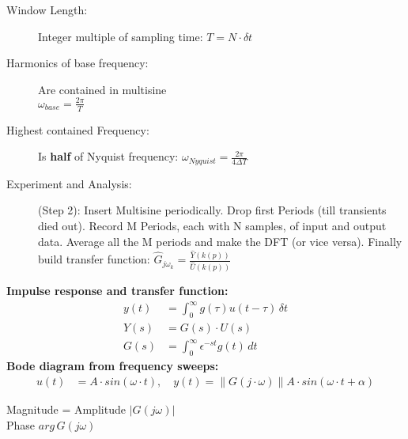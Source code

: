 \begin{tcolorbox}[colback=brown!5!white,colframe=brown!75!black,title=\textbf{Multisine Identification Implementation procedure}]
\begin{description}
	\item[Window Length:] Integer multiple of sampling time: $T = N \cdot \delta t$

	\item[Harmonics of base frequency:] Are contained in multisine \\ $\omega_{base} = \frac{2\pi}{T}$

	\item[Highest contained Frequency:] Is \textbf{half} of Nyquist frequency: $\omega_{Nyquist} = \frac{2\pi}{4\Delta T}$

	\item[Experiment and Analysis:] (Step 2): Insert Multisine periodically. Drop first Periods (till transients died out). Record M Periods, each with N samples, of input and output data. Average all the M periods and make the DFT (or vice versa). Finally build transfer function: $ \hat{G}_{{j\omega}_{k}} = \frac{\hat Y(k(p))}{\hat U (k(p))}$
\end{description}
\end{tcolorbox}

\begin{tcolorbox}[colback=brown!5!white,colframe=brown!75!black,title=\textbf{Nonparametric and Frequency Domain Identification Models}]
\textbf{Impulse response and transfer function:}
\begin{align*}
	y(t) &= \int_{0}^{\infty} g(\tau) u(t-\tau) \, \delta t \\
	Y(s) &= G(s)\cdot U(s) \\
	G(s) &= \int_{0}^{\infty} \epsilon^{-st} g(t) \, dt 
\end{align*}
\textbf{Bode diagram from frequency sweeps:}
\begin{align*}
	u(t) &= A \cdot sin(\omega \cdot t),\quad y(t) = \lVert G (j\cdot \omega )\rVert A \cdot sin(\omega \cdot t + \alpha)
\end{align*}
\end{tcolorbox}

\begin{tcolorbox}[colback=brown!5!white,colframe=brown!75!black,title=\textbf{Bode Diagramm}]
	Magnitude = Amplitude $|G(j\omega)|$\\
	Phase $arg \, G(j\omega)$
\end{tcolorbox}


